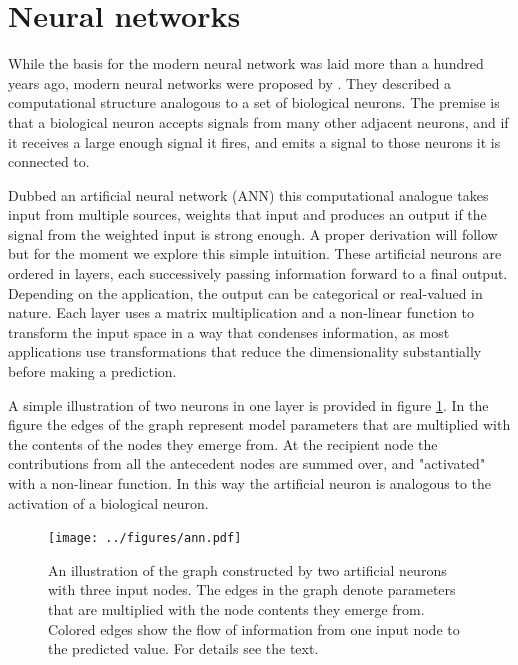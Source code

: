
\section{Neural networks}\label{sec:ANN}

While the basis for the modern neural network was laid more than a hundred years ago, modern neural networks were proposed by \citet{McCulloch1943}. They described a computational structure analogous to a set of biological neurons. The premise is that a biological neuron accepts signals from many other adjacent neurons, and if it receives a large enough signal it fires, and emits a signal to those neurons it is connected to.  

Dubbed an artificial neural network (ANN) this computational analogue takes input from multiple sources, weights that input and produces an output if the signal from the weighted input is strong enough. A proper derivation will follow but for the moment we explore this simple intuition. These artificial neurons are ordered in layers, each successively passing information forward to a final output. Depending on the application, the output can be categorical or real-valued in nature. Each layer uses a matrix multiplication and a non-linear function to transform the input space in a way that condenses information, as most applications use transformations that reduce the dimensionality substantially before making a prediction.

A simple illustration of two neurons in one layer is provided in figure \ref{fig:ann_illustration}. In the figure the edges of the graph represent model parameters that are multiplied with the contents of the nodes they emerge from. At the recipient node the contributions from all the antecedent nodes are summed over, and "activated" with a non-linear function. In this way the artificial neuron is analogous to the activation of a biological neuron.

\begin{figure}[h]
\centering
\texttt{[image: ../figures/ann.pdf]}
\caption[Fully connected neural network illustration]{An illustration of the graph constructed by two artificial neurons with three input nodes. The edges in the graph denote parameters that are multiplied with the node contents they emerge from. Colored edges show the flow of information from one input node to the predicted value. For details see the text.}\label{fig:ann_illustration}
\end{figure}


